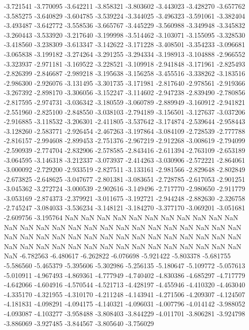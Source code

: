 -3.721541
-3.770095
-3.642211
-3.858321
-3.803602
-3.443023
-3.428270
-3.657762
-3.585275
-3.640829
-3.604785
-3.539224
-3.344025
-3.496323
-3.591061
-3.382404
-3.493487
-3.642772
-3.558536
-3.665767
-3.445229
-3.560988
-3.349948
-3.345832
-3.260443
-3.533920
-3.217640
-3.199998
-3.514462
-3.103071
-3.155095
-3.328530
-3.418560
-3.238309
-3.613347
-3.142622
-3.171228
-3.408501
-3.354233
-3.096681
-3.065838
-3.199182
-3.274264
-3.291255
-3.294334
-3.198913
-3.104888
-2.966552
-3.323937
-2.971181
-3.169522
-3.228521
-3.109918
-2.941848
-3.171961
-2.825493
-2.826399
-2.846687
-2.989218
-3.195638
-3.156258
-3.455516
-3.338262
-3.183516
-2.986300
-2.926076
-3.131495
-3.301735
-3.171981
-2.817640
-2.978561
-2.919366
-3.267392
-2.898170
-3.306056
-3.152247
-3.114602
-2.947238
-2.839490
-2.780856
-2.817595
-2.974731
-3.036342
-3.180559
-3.060789
-2.889949
-3.160912
-2.941821
-2.551960
-2.825100
-2.848550
-3.038103
-2.794189
-3.156501
-3.127637
-3.037206
-2.916885
-3.118532
-3.206301
-2.411805
-3.537642
-3.174874
-2.539644
-2.958443
-3.128260
-2.583771
-2.926454
-2.467263
-3.197864
-3.084109
-2.728539
-2.777788
-2.816157
-2.994608
-2.899453
-2.751376
-2.967219
-2.912268
-3.008619
-2.794099
-2.590939
-2.774704
-2.832906
-2.578585
-2.843416
-2.611394
-2.763109
-2.653189
-3.064595
-3.146318
-3.212337
-3.073937
-2.414263
-3.030906
-2.572221
-2.864061
-3.000092
-2.729200
-2.933519
-2.827511
-3.133161
-2.981566
-2.829648
-2.802849
-2.673825
-2.648625
-3.047677
-2.801381
-3.083651
-2.728785
-2.617053
-2.901251
-3.045362
-3.272724
-3.000539
-2.902616
-3.149496
-2.717770
-2.980650
-2.911779
-3.053169
-2.874373
-2.379921
-3.011675
-3.192721
-2.944248
-2.882630
-2.326758
-2.745247
-3.084033
-3.536234
-3.148121
-3.184270
-3.377170
-3.069201
-3.051681
-2.609756
-3.195764
NaN
NaN
NaN
NaN
NaN
NaN
NaN
NaN
NaN
NaN
NaN
NaN
NaN
NaN
NaN
NaN
NaN
NaN
NaN
NaN
NaN
NaN
NaN
NaN
NaN
NaN
NaN
NaN
NaN
NaN
NaN
NaN
NaN
NaN
NaN
NaN
NaN
NaN
NaN
NaN
NaN
NaN
NaN
NaN
NaN
NaN
NaN
NaN
NaN
NaN
NaN
NaN
NaN
NaN
NaN
NaN
NaN
-6.782563
-6.480617
-6.262822
-6.076698
-5.921422
-5.803378
-5.681755
-5.586560
-5.465379
-5.395606
-5.302986
-5.256135
-5.180647
-5.109772
-5.057613
-5.010911
-4.967493
-4.869361
-4.777949
-4.740402
-4.830386
-4.685297
-4.717779
-4.642066
-4.604916
-4.570544
-4.521713
-4.428197
-4.455946
-4.410320
-4.463040
-4.335170
-4.321955
-4.310170
-4.211248
-4.143941
-4.271506
-4.209307
-4.124507
-4.181831
-4.098291
-4.094175
-4.140321
-4.096031
-4.007796
-4.014142
-3.988052
-4.093087
-4.103277
-3.958488
-3.808403
-3.844229
-4.011701
-3.806281
-3.924798
-3.886069
-3.927485
-3.844567
-3.805640
-3.756029
